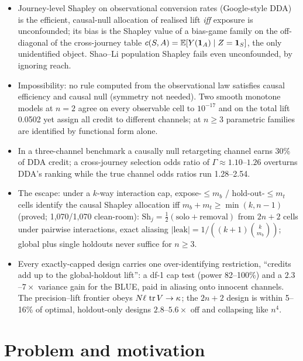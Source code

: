 \begin{keyideas}
\begin{itemize}
\item Journey-level Shapley on observational conversion rates (Google-style DDA) is the efficient, causal-null allocation of realised lift \emph{iff} exposure is unconfounded; its bias is the Shapley value of a bias-game family on the off-diagonal of the cross-journey table $c(S,A) = \mathbb{E}[Y(\mathbf{1}_A) \mid Z = \mathbf{1}_S]$, the only unidentified object. Shao--Li population Shapley fails even unconfounded, by ignoring reach.
\item Impossibility: no rule computed from the observational law satisfies causal efficiency and causal null (symmetry not needed). Two smooth monotone models at $n = 2$ agree on every observable cell to $10^{-17}$ and on the total lift 0.0502 yet assign all credit to different channels; at $n \ge 3$ parametric families are identified by functional form alone.
\item In a three-channel benchmark a causally null retargeting channel earns 30\% of DDA credit; a cross-journey selection odds ratio of $\Gamma \approx 1.10$--$1.26$ overturns DDA's ranking while the true channel odds ratios run 1.28--2.54.
\item The escape: under a $k$-way interaction cap, expose-$\le m_b$ / hold-out-$\le m_t$ cells identify the causal Shapley allocation iff $m_b + m_t \ge \min(k, n-1)$ (proved; 1,070/1,070 clean-room): $\mathrm{Sh}_j = \tfrac12(\text{solo} + \text{removal})$ from $2n+2$ cells under pairwise interactions, exact aliasing $|\text{leak}| = 1/((k+1)\binom{k}{m_b})$; global plus single holdouts never suffice for $n \ge 3$.
\item Every exactly-capped design carries one over-identifying restriction, ``credits add up to the global-holdout lift'': a df-1 cap test (power 82--100\%) and a $2.3$--$7\times$ variance gain for the BLUE, paid in aliasing onto innocent channels. The precision--lift frontier obeys $N\ell\,\operatorname{tr} V \to \kappa$; the $2n+2$ design is within 5--16\% of optimal, holdout-only designs $2.8$--$5.6\times$ off and collapsing like $n^4$.
\end{itemize}
\end{keyideas}

\section{Problem and motivation}

